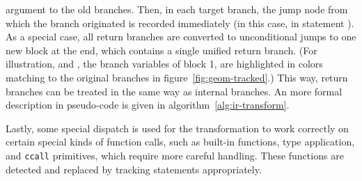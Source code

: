 argument to the old branches.  Then, in each target branch, the jump node from which the branch
originated is recorded immediately (in this case, in statement ).  As a special case,
all return branches are converted to unconditional jumps to one new block at the end, which contains
a single unified return branch.  (For illustration,  and , the branch
variables of block 1, are highlighted in colors matching to the original branches in
figure~\ref{fig:geom-tracked}.)  This way, return branches can be treated in the same way as internal
branches.  An more formal description in pseudo-code is given in algorithm~\ref{alg:ir-transform}.

Lastly, some special dispatch is used for the transformation to work correctly on certain special
kinds of function calls, such as built-in functions, type application, and \texttt{ccall}
primitives, which require more careful handling.  These functions are detected and replaced by
 tracking statements appropriately.

